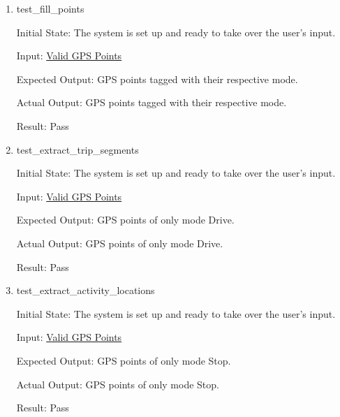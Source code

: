 \documentclass[12pt, titlepage]{article}
\begin{document}
\begin{enumerate}
    \item{test\_fill\_points} \label{test_fill_points}

    Initial State: The system is set up and ready to take over the user’s input.
    
    Input: \href{https://github.com/paezha/PyERT-BLACK/blob/rev0-test/quarto-example/data/sample-gps/sample-gps-1.csv}{Valid GPS Points}

    Expected Output: GPS points tagged with their respective mode.
    
    Actual Output: GPS points tagged with their respective mode.

    Result: Pass

    \item{test\_extract\_trip\_segments} \label{test_extract_trip_segments}

    Initial State: The system is set up and ready to take over the user’s input.
    
    Input: \href{https://github.com/paezha/PyERT-BLACK/blob/rev0-test/quarto-example/data/sample-gps/sample-gps-1.csv}{Valid GPS Points}
    
    Expected Output: GPS points of only mode Drive.
    
    Actual Output: GPS points of only mode Drive.

    Result: Pass

    \item{test\_extract\_activity\_locations} \label{test_extract_activity_locations}

    Initial State: The system is set up and ready to take over the user’s input.
    
    Input: \href{https://github.com/paezha/PyERT-BLACK/blob/rev0-test/quarto-example/data/sample-gps/sample-gps-1.csv}{Valid GPS Points}
    
    Expected Output: GPS points of only mode Stop.
    
    Actual Output: GPS points of only mode Stop.

    Result: Pass

\end{enumerate}
\end{document}
